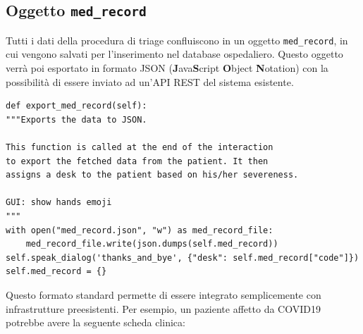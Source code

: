 \subsection{Oggetto \texttt{med\_record}}
Tutti i dati della procedura di triage confluiscono in un oggetto \texttt{med\_record}, in cui vengono salvati per l'inserimento nel database ospedaliero. Questo oggetto verrà poi esportato in formato JSON (\textbf{J}ava\textbf{S}cript \textbf{O}bject \textbf{N}otation) con la possibilità di essere inviato ad un'API REST del sistema esistente.
\begin{verbatim}
def export_med_record(self):
"""Exports the data to JSON.

This function is called at the end of the interaction
to export the fetched data from the patient. It then
assigns a desk to the patient based on his/her severeness.

GUI: show hands emoji
"""
with open("med_record.json", "w") as med_record_file:
    med_record_file.write(json.dumps(self.med_record))
self.speak_dialog('thanks_and_bye', {"desk": self.med_record["code"]})
self.med_record = {}
\end{verbatim}
Questo formato standard permette di essere integrato semplicemente con infrastrutture preesistenti. Per esempio, un paziente affetto da COVID19 potrebbe avere la seguente scheda clinica:
\inputminted{json}{code/med_record.json}
